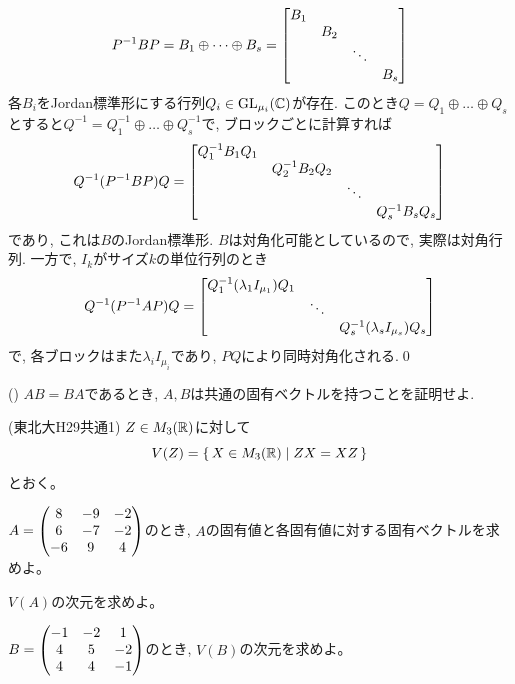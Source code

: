 \[
P^{-1}BP = B_1\oplus \dots \oplus B_s =  \begin{bmatrix}B_1 & \\ & B_2 \\ && \ddots \\ &&& B_s \end{bmatrix}
\]
各$B_i$をJordan標準形にする行列$Q_i \in \mathrm{GL}_{\mu_i}(\mathbb{C})$が存在. このとき$Q = Q_1\oplus \dots \oplus Q_s$とすると$Q^{-1} = Q_1^{-1}\oplus \dots \oplus Q_s^{-1}$で, ブロックごとに計算すれば
\[Q^{-1}(P^{-1}BP)Q = \begin{bmatrix}Q_1^{-1}B_1Q_1 & \\ & Q_2^{-1}B_2Q_2 \\ && \ddots \\ &&& Q_s^{-1}B_sQ_s \end{bmatrix}\]
であり, これは$B$のJordan標準形. $B$は対角化可能としているので, 実際は対角行列.
一方で, $I_k$がサイズ$k$の単位行列のとき
\[Q^{-1}(P^{-1}A P) Q =  \begin{bmatrix}Q_1^{-1}(\lambda_1I_{\mu_1})Q_1 & \\
& \ddots \\ && Q_s^{-1}(\lambda_s I_{\mu_s})Q_s \end{bmatrix}\]
で, 各ブロックはまた$\lambda_i I_{\mu_i}$であり, $PQ$により同時対角化される.\qed


\begin{egprob} ()
$AB=BA$であるとき, $A,B$は共通の固有ベクトルを持つことを証明せよ.
\end{egprob}
\begin{egans}
\end{egans}




\begin{egprob} (東北大H29共通1)\label{tohoku-H29-C1}
$Z\in M_{3}(\mathbb{R})$に対して
\[V(Z) = \set{X\in M_3(\mathbb{R})\mid ZX=XZ}\]
とおく。
\ben
\item $A = \begin{pmatrix} 8 & -9 & -2\\ 6 & -7 & -2 \\ -6 & 9 & 4 \end{pmatrix}$のとき, $A$の固有値と各固有値に対する固有ベクトルを求めよ。
\item $V(A)$の次元を求めよ。
\item $B=\begin{pmatrix} -1 & -2 & 1\\ 4 & 5 & -2 \\ 4 & 4 & -1 \end{pmatrix}$のとき, $V(B)$の次元を求めよ。
\een
\end{egprob}

